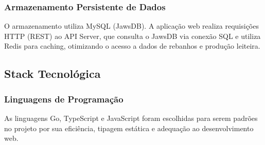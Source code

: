 \documentclass[12pt, a4paper]{article}
\begin{document}
\subsubsection{Armazenamento Persistente de Dados}
\begin{spacing}{1.5}
O armazenamento utiliza MySQL (JawsDB). A aplicação web realiza requisições HTTP (REST) ao API Server, que consulta o JawsDB via conexão SQL e utiliza Redis para caching, otimizando o acesso a dados de rebanhos e produção leiteira.
\end{spacing}

\subsection{Stack Tecnológica}
\begin{spacing}{1.5}
\subsubsection{Linguagens de Programação}
As linguagens Go, TypeScript e JavaScript foram escolhidas para serem padrões no projeto por sua eficiência, tipagem estática e adequação ao desenvolvimento web.


\end{spacing}
\end{document}
